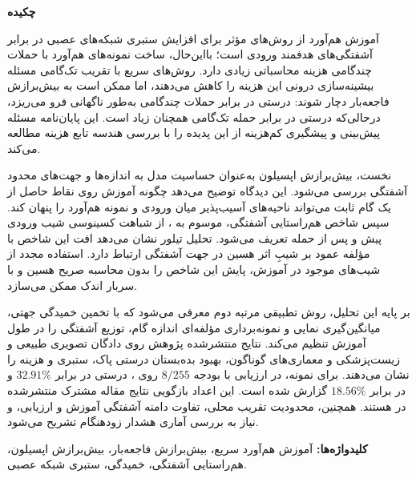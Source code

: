 \begin{center}\textbf{چکیده}\end{center}
\noindent
آموزش هم‌آورد از روش‌های مؤثر برای افزایش ستبری شبکه‌های عصبی در برابر آشفتگی‌های هدفمند ورودی است؛ بااین‌حال، ساخت نمونه‌های هم‌آورد با حملات چندگامی هزینه محاسباتی زیادی دارد. روش‌های سریع با تقریب تک‌گامی مسئله بیشینه‌سازی درونی این هزینه را کاهش می‌دهند، اما ممکن است به بیش‌برازش فاجعه‌بار دچار شوند: درستی در برابر حملات چندگامی به‌طور ناگهانی فرو می‌ریزد، درحالی‌که درستی در برابر حمله تک‌گامی همچنان زیاد است. این پایان‌نامه مسئله پیش‌بینی و پیشگیری کم‌هزینه از این پدیده را با بررسی هندسه تابع هزینه مطالعه می‌کند.

نخست، بیش‌برازش اپسیلون به‌عنوان حساسیت مدل به اندازه‌ها و جهت‌های محدود آشفتگی بررسی می‌شود. این دیدگاه توضیح می‌دهد چگونه آموزش روی نقاط حاصل از یک گام ثابت می‌تواند ناحیه‌های آسیب‌پذیر میان ورودی و نمونه هم‌آورد را پنهان کند. سپس شاخص هم‌راستایی آشفتگی، موسوم به \pertalign، از شباهت کسینوسی شیب ورودی پیش و پس از حمله تعریف می‌شود. تحلیل تیلور نشان می‌دهد افت این شاخص با مؤلفه عمود بر شیبِ اثر هسین در جهت آشفتگی ارتباط دارد. استفاده مجدد از شیب‌های موجود در آموزش، پایش این شاخص را بدون محاسبه صریح هسین و با سربار اندک ممکن می‌سازد.

بر پایه این تحلیل، روش تطبیقی مرتبه دوم \sora{} معرفی می‌شود که با تخمین خمیدگی جهتی، میانگین‌گیری نمایی و نمونه‌برداری مؤلفه‌ای اندازه گام، توزیع آشفتگی را در طول آموزش تنظیم می‌کند. نتایج منتشرشده پژوهش روی دادگان تصویری طبیعی و زیست‌پزشکی و معماری‌های گوناگون، بهبود بده‌بستان درستی پاک، ستبری و هزینه را نشان می‌دهند. برای نمونه، در ارزیابی  با بودجه $8/255$ روی ، درستی \sora{} در  برابر $32.91\%$ و در  برابر $18.56\%$ گزارش شده است. این اعداد بازگویی نتایج مقاله مشترک منتشرشده در  هستند. همچنین، محدودیت تقریب محلی، تفاوت دامنه آشفتگی آموزش و ارزیابی، و نیاز به بررسی آماری هشدار زودهنگام تشریح می‌شود.

\bigskip
\noindent\textbf{کلیدواژه‌ها:}
آموزش هم‌آورد سریع، بیش‌برازش فاجعه‌بار، بیش‌برازش اپسیلون، هم‌راستایی آشفتگی، خمیدگی، ستبری شبکه عصبی.

